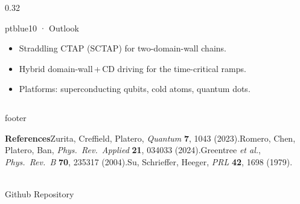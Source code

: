 \documentclass[final]{beamer}
\begin{document}
\begin{frame}[t]
\begin{columns}[t,onlytextwidth]
\begin{column}{0.32\textwidth}
  \begin{pblock}{ptblue}{10 · Outlook}
    \begin{itemize}
      \item Straddling CTAP (SCTAP) for two-domain-wall chains.
      \item Hybrid domain-wall\,+\,CD driving for the time-critical ramps.
      \item Platforms: superconducting qubits, cold atoms, quantum dots.
    \end{itemize}
  \end{pblock}

\end{column}
\end{columns}

\vspace{0.25cm}

\begin{beamercolorbox}[wd=\textwidth,sep=16pt,rounded=true]{footer}
  \begin{minipage}[c]{0.80\textwidth}
    {\small\textbf{References}\quad
    [9] Zurita, Creffield, Platero, \emph{Quantum} \textbf{7}, 1043 (2023).\quad
    [13] Romero, Chen, Platero, Ban, \emph{Phys.\ Rev.\ Applied} \textbf{21}, 034033 (2024).\quad
    [14] Greentree \emph{et al.}, \emph{Phys.\ Rev.\ B} \textbf{70}, 235317 (2004).\quad
    [6] Su, Schrieffer, Heeger, \emph{PRL} \textbf{42}, 1698 (1979).}
  \end{minipage}\hfill
  \begin{minipage}[c]{0.17\textwidth}\centering
    \colorbox{white}{\color{black}}\\[4pt]{\small Github Repository}
  \end{minipage}
\end{beamercolorbox}

\end{frame}
\end{document}
